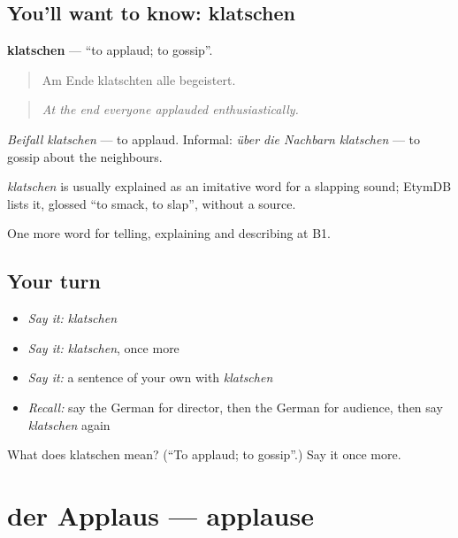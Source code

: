 \subsection*{You'll want to know: klatschen}
\textbf{klatschen} — \textquotedblleft{}to applaud; to gossip\textquotedblright{}.

\begin{quote}
Am Ende klatschten alle begeistert.
\end{quote}

\begin{quote}
\emph{At the end everyone applauded enthusiastically.}
\end{quote}

\emph{Beifall klatschen} — to applaud. Informal: \emph{über die Nachbarn klatschen} — to gossip about the neighbours.

\begin{cousinweb}
\emph{klatschen} is usually explained as an imitative word for a slapping sound; EtymDB lists it, glossed \textquotedblleft{}to smack, to slap\textquotedblright{}, without a source.
\end{cousinweb}

\begin{grammarlens}[title={What you've built}]
One more word for telling, explaining and describing at B1.
\end{grammarlens}

\subsection*{Your turn}
\begin{itemize}
\raggedright
  \item \emph{Say it:} \emph{klatschen}
  \item \emph{Say it:} \emph{klatschen}, once more
  \item \emph{Say it:} a sentence of your own with \emph{klatschen}
  \item \emph{Recall:} say the German for director, then the German for audience, then say \emph{klatschen} again
\end{itemize}

\begin{tcolorbox}[breakable,colback=teal!4,colframe=teal!35!black,title={Before you move on}]
What does klatschen mean? (\textquotedblleft{}To applaud; to gossip\textquotedblright{}.) Say it once more.
\end{tcolorbox}
\section[der Applaus]{der Applaus — applause}

